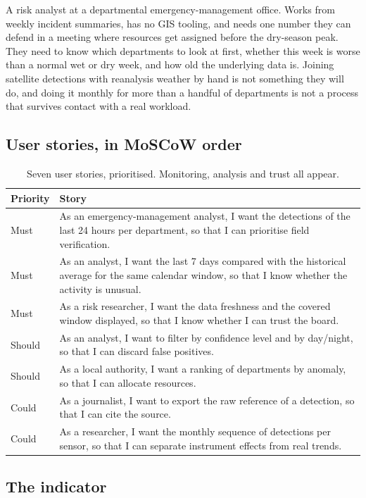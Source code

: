 \documentclass[11pt,a4paper]{article}
\begin{document}
A risk analyst at a departmental emergency-management office. Works from weekly incident summaries,
has no GIS tooling, and needs one number they can defend in a meeting where resources get assigned
before the dry-season peak. They need to know which departments to look at first, whether this week
is worse than a normal wet or dry week, and how old the underlying data is. Joining satellite
detections with reanalysis weather by hand is not something they will do, and doing it monthly for
more than a handful of departments is not a process that survives contact with a real workload.

\subsection{User stories, in MoSCoW order}

\begin{table}[h]
\centering
\small
\begin{tabular}{L{1.3cm}L{13.7cm}}
\toprule
\textbf{Priority} & \textbf{Story} \\
\midrule
Must & As an emergency-management analyst, I want the detections of the last 24 hours per department, so that I can prioritise field verification. \\
Must & As an analyst, I want the last 7 days compared with the historical average for the same calendar window, so that I know whether the activity is unusual. \\
Must & As a risk researcher, I want the data freshness and the covered window displayed, so that I know whether I can trust the board. \\
Should & As an analyst, I want to filter by confidence level and by day/night, so that I can discard false positives. \\
Should & As a local authority, I want a ranking of departments by anomaly, so that I can allocate resources. \\
Could & As a journalist, I want to export the raw reference of a detection, so that I can cite the source. \\
Could & As a researcher, I want the monthly sequence of detections per sensor, so that I can separate instrument effects from real trends. \\
\bottomrule
\end{tabular}
\caption{Seven user stories, prioritised. Monitoring, analysis and trust all appear.}
\end{table}

\subsection{The indicator}\label{sec:indicator}
\end{document}
